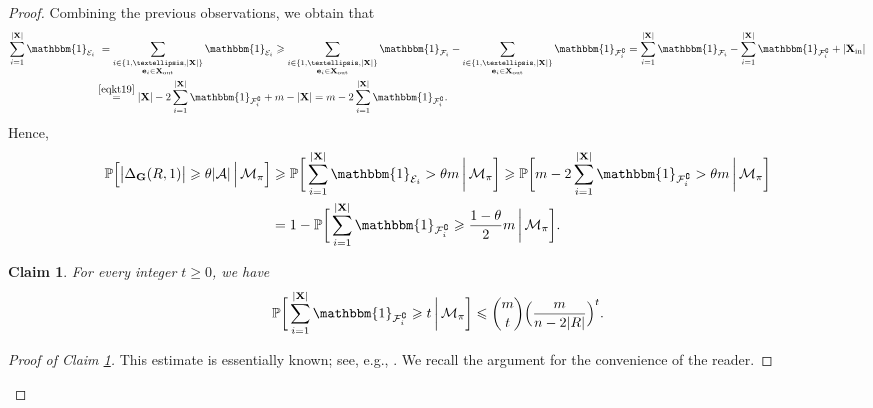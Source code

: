 \documentclass[11pt,leqno]{amsart}
\newtheorem{claim}[theorem]{Claim}
\theoremstyle{remark}
\theoremstyle{plain}
\begin{document}
\begin{proof}
Combining the previous observations, we obtain that
\begin{align*}
\sum_{i=1}^{|\mathbf{X}|} \mathbbm{1}_{\mathcal{E}_i} & \ =
\sum_{\substack{i\in \{1,\dots,|\mathbf{X}|\}\\\mathbf{e}_i\in \mathbf{X}_\mathrm{out}}} \mathbbm{1}_{\mathcal{E}_i} \geqslant
\sum_{\substack{i\in \{1,\dots,|\mathbf{X}|\}\\\mathbf{e}_i\in \mathbf{X}_\mathrm{out}}} \mathbbm{1}_{\mathcal{F}_i} -
\sum_{\substack{i\in \{1,\dots,|\mathbf{X}|\}\\\mathbf{e}_i\in \mathbf{X}_\mathrm{out}}} \mathbbm{1}_{\mathcal{F}_i^\complement} =
\sum_{i=1}^{|\mathbf{X}|} \mathbbm{1}_{\mathcal{F}_i} -
\sum_{i=1}^{|\mathbf{X}|} \mathbbm{1}_{\mathcal{F}_i^\complement} + |\mathbf{X}_{\mathrm{in}}| \\
& \stackrel{\eqref{eqkt19}}{=} |\mathbf{X}| - 2 \sum_{i=1}^{|\mathbf{X}|} \mathbbm{1}_{\mathcal{F}_i^\complement} +
m - |\mathbf{X}| = m - 2 \sum_{i=1}^{|\mathbf{X}|} \mathbbm{1}_{\mathcal{F}_i^\complement}.
\end{align*}
Hence,
\begin{align} \label{newnew-sd}
\mathbb{P}\Big[ \big|\Delta_{\mathbf{G}}(R,1)\big|\geqslant \theta|\mathcal{A}| \, \Big|
\, \mathcal{M}_{\pi} \Big] & \geqslant
\mathbb{P}\bigg[ \sum_{i=1}^{|\mathbf{X}|} \mathbbm{1}_{\mathcal{E}_i}>\theta m \, \bigg|\, \mathcal{M}_{\pi} \bigg] \geqslant
\mathbb{P}\bigg[  m - 2 \sum_{i=1}^{|\mathbf{X}|} \mathbbm{1}_{\mathcal{F}_i^\complement}>
\theta m\, \bigg|\, \mathcal{M}_{\pi} \bigg] \\
& = 1 - \mathbb{P}\bigg[  \sum_{i=1}^{|\mathbf{X}|} \mathbbm{1}_{\mathcal{F}_i^\complement}
\geqslant \frac{1-\theta}{2}m \, \bigg|\, \mathcal{M}_{\pi} \bigg]. \nonumber
\end{align}
\begin{claim} \label{claim-sd}
For every integer $t\geqslant 0$, we have
\[  \mathbb{P}\bigg[  \sum_{i=1}^{|\mathbf{X}|} \mathbbm{1}_{\mathcal{F}_i^\complement} \geqslant t
\, \bigg|\, \mathcal{M}_{\pi} \bigg] \leqslant
\binom{m}{t}  \Big(\frac{m}{n-2|R|}\Big)^{t}. \]
\end{claim}
\begin{proof}[Proof of Claim \ref{claim-sd}]
This estimate is essentially known;  see, e.g., \cite[Lemma 2.1]{LS10}. We recall the argument for the
convenience of the reader.


\end{proof}
\end{proof}
\end{document}
